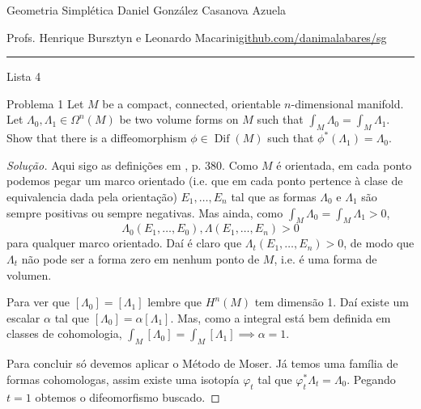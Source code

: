 
\usepackage[style=authortitle-terse,backend=bibtex]{biblatex}




\begin{minipage}{\textwidth}
	\begin{minipage}{1\textwidth}
		Geometria Simpl\'etica \hfill Daniel González Casanova Azuela
		
		{\small Profs. Henrique Bursztyn e Leonardo Macarini\hfill\href{https://github.com/danimalabares/sg}{github.com/danimalabares/sg}}
	\end{minipage}
\end{minipage}\vspace{.2cm}\hrule

\vspace{10pt}
{\huge Lista 4}

\tableofcontents

\begin{idea4}{Problema 1}\leavevmode
Let $M$ be a compact, connected, orientable $n$-dimensional manifold. Let $\Lambda_0,\Lambda_1\in\Omega^{n}(M)$ be two volume forms on $M$ such that $\int_{M}\Lambda_0=\int_{M}\Lambda_1$. Show that there is a diffeomorphism $\phi \in \operatorname{Dif}(M)$ such that $\phi^*\left( \Lambda_1 \right) =\Lambda_0$.
\end{idea4}

\begin{proof}[Solução]
Aqui sigo as definições em \cite{lee}, p. 380.  Como $M$ é orientada, em cada ponto podemos pegar um marco orientado (i.e. que em cada ponto pertence à clase de equivalencia dada pela orientação) $E_1,\ldots,E_n$ tal que as formas $\Lambda_0$ e $\Lambda_1$ são sempre positivas ou sempre negativas. Mas ainda, como $\int_{M}\Lambda_0=\int_{M}\Lambda_1>0$,
\[\Lambda_0(E_1,\ldots,E_0),\Lambda(E_1,\ldots,E_n)>0\]
para qualquer marco orientado. Daí é claro que $\Lambda_t(E_1,\ldots,E_n)>0$, de modo que $\Lambda_t$ não pode ser a forma zero em nenhum ponto de $M$, i.e. é uma forma de volumen.

	Para ver que $\left[ \Lambda_0 \right] =\left[ \Lambda_1 \right] $ lembre que $H^{n}(M)$ tem dimensão 1. Daí existe um escalar $\alpha$ tal que $\left[ \Lambda_0 \right] =\alpha \left[ \Lambda_1 \right] $. Mas, como a integral está bem definida em classes de cohomologia, $\int_{M}\left[ \Lambda_0 \right] =\int_{M}\left[ \Lambda_1 \right] \implies \alpha=1$.

Para concluir só devemos aplicar o Método de Moser. Já temos uma família de formas cohomologas, assim existe uma isotopía $ \varphi_t$ tal que $\varphi^*_{t}\Lambda_t=\Lambda_0$. Pegando $t=1$ obtemos o difeomorfismo buscado.
\end{proof}

